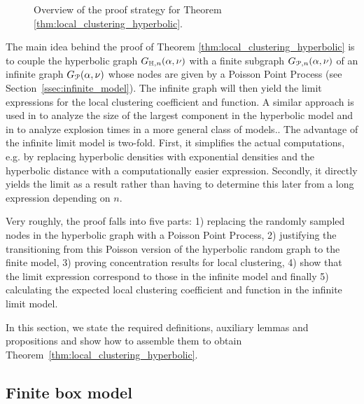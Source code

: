 \begin{figure}[!t]

\caption{Overview of the proof strategy for Theorem \ref{thm:local_clustering_hyperbolic}.}
\label{fig:overview_proof}
\end{figure}

The main idea behind the proof of Theorem \ref{thm:local_clustering_hyperbolic} is to couple the hyperbolic graph $G_{\mathbb{H}, n}(\alpha, \nu)$ with a finite subgraph $G_{{\mathcal P},n}(\alpha,\nu)$ of an infinite graph $G_{{\mathcal P}}(\alpha,\nu)$ whose nodes are given by a Poisson Point Process (see Section~\ref{ssec:infinite_model}). The infinite graph will then yield the limit expressions for the local clustering coefficient and function. A similar approach is used in \cite{fountoulakis2018law} to analyze the size of the largest component in the hyperbolic model and in \cite{komjathy2018explosion} to analyze explosion times in a more general class of models.. 
The advantage of the infinite limit model is two-fold. First, it simplifies the actual computations, e.g. by replacing hyperbolic densities with exponential densities and the hyperbolic distance with a computationally easier expression. Secondly, it directly yields the limit as a result rather than having to determine this later from a long expression depending on $n$. 

Very roughly, the proof falls into five parts: 1) replacing the randomly sampled nodes in the hyperbolic graph with a Poisson Point Process, 2) justifying the transitioning from this Poisson version of the hyperbolic random graph to the finite model, 3) proving concentration results for local clustering, 4) show that the limit expression correspond to those in the infinite model and finally 5) calculating the expected local clustering coefficient and function in the infinite limit model.
	
In this section, we state the required definitions, auxiliary lemmas and propositions and show how to assemble them to obtain Theorem~\ref{thm:local_clustering_hyperbolic}.

\subsection{Finite box model}\label{ssec:finite_model}

